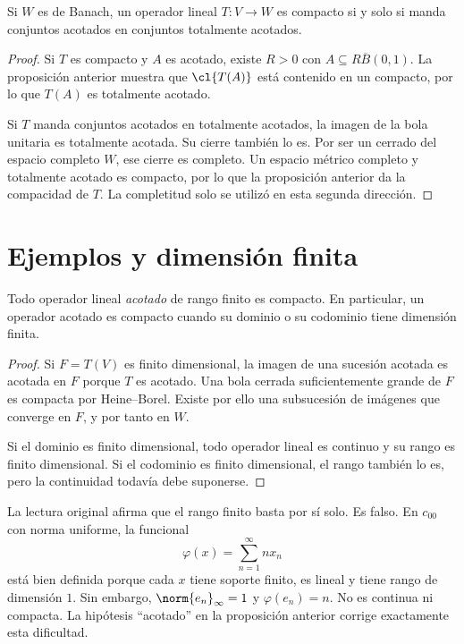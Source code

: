 \begin{proposicion}\label{ch23:totalmente-acotado}
Si $W$ es de Banach, un operador lineal $T:V\to W$ es compacto si y solo si manda conjuntos acotados en conjuntos totalmente acotados.
\end{proposicion}
\begin{proof}
Si $T$ es compacto y $A$ es acotado, existe $R>0$ con $A\subseteq R\overline B(0,1)$. La proposición anterior muestra que $\cl{T(A)}$ está contenido en un compacto, por lo que $T(A)$ es totalmente acotado.

Si $T$ manda conjuntos acotados en totalmente acotados, la imagen de la bola unitaria es totalmente acotada. Su cierre también lo es. Por ser un cerrado del espacio completo $W$, ese cierre es completo. Un espacio métrico completo y totalmente acotado es compacto, por lo que la proposición anterior da la compacidad de $T$. La completitud solo se utilizó en esta segunda dirección.
\end{proof}

\section{Ejemplos y dimensión finita}

\begin{proposicion}\label{ch23:rango-finito}
Todo operador lineal \emph{acotado} de rango finito es compacto. En particular, un operador acotado es compacto cuando su dominio o su codominio tiene dimensión finita.
\end{proposicion}
\begin{proof}
Si $F=T(V)$ es finito dimensional, la imagen de una sucesión acotada es acotada en $F$ porque $T$ es acotado. Una bola cerrada suficientemente grande de $F$ es compacta por Heine--Borel. Existe por ello una subsucesión de imágenes que converge en $F$, y por tanto en $W$.

Si el dominio es finito dimensional, todo operador lineal es continuo y su rango es finito dimensional. Si el codominio es finito dimensional, el rango también lo es, pero la continuidad todavía debe suponerse.
\end{proof}

\begin{observacion}
La lectura original afirma que el rango finito basta por sí solo. Es falso. En $c_{00}$ con norma uniforme, la funcional
\[
 \varphi(x)=\sum_{n=1}^{\infty}n x_n
\]
está bien definida porque cada $x$ tiene soporte finito, es lineal y tiene rango de dimensión $1$. Sin embargo, $\norm{e_n}_\infty=1$ y $\varphi(e_n)=n$. No es continua ni compacta. La hipótesis ``acotado'' en la proposición anterior corrige exactamente esta dificultad.
\end{observacion}

